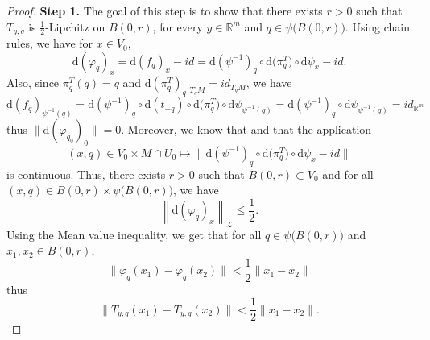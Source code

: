 \documentclass[10pt,a4paper]{amsart}
\newcommand{\R}{\mathbb{R}}
\renewcommand{\d}{\mathrm{d}}
\renewcommand{\leq}{\leqslant}
\newcommand{\opnorm}[1]{{\left\| #1 \right\|}_{\mathcal{L}}}
\begin{document}
\begin{proof}
    \noindent \textbf{Step 1.} The goal of this step is to show that there exists $r > 0$ such that $T_{y,q}$ is $\frac{1}{2}$-Lipchitz on $B(0,r)$, for every $y \in \R^m$ and $q \in \psi \big( B(0,r) \big)$.    
    Using chain rules, we have for $x \in V_0$,
    \[ \d (\varphi_{q})_{x} = \d ( f_{q})_{x} - id = \d (\psi^{-1})_{q} \circ \d \big( \pi_{q}^T\big) \circ \d \psi_{x} - id .  \]
    Also, since $ \pi_{q}^T(q) = q$ and $\d (\pi_{q}^T)_{q} |_{T_q M} = id_{T_{q}M}$, we have
    $$\d (f_{q})_{\psi^{-1}(q)} = \d (\psi^{-1})_{q}  \circ \d (t_{-q}) \circ \d \big( \pi_{q}^T\big) \circ \d \psi_{\psi^{-1}(q)} = \d (\psi^{-1})_{q} \circ \d \psi_{\psi^{-1}(q)} = id_{\R^m}$$
    thus $\| \d (\varphi_{q_0})_{0} \| = 0$.
    Moreover, we know that  and that the application 
    \[ (x,q) \in V_0 \times M \cap U_0 \mapsto  \| \d (\psi^{-1})_{q} \circ \d \big( \pi_{q}^T\big) \circ \d \psi_{x} - id  \| \]
    is continuous.
    Thus, there exists $r > 0$ such that $B(0,r) \subset V_0$ and for all $(x, q) \in B(0,r) \times \psi \big( B(0,r) \big)$, we have
    \begin{equation} \label{eq: maitrise_condition_projection}
        \opnorm{ \d ( \varphi_{q})_{x} }  \leq \frac{1}{2}.
    \end{equation}
    Using the Mean value inequality, we get that for all $q \in \psi \big( B(0,r) \big)$ and $ x_1,x_2 \in  B(0,r)$,
    $$ \| \varphi_{q}(x_1) - \varphi_{q}(x_2) \| < \frac{1}{2} \| x_1 - x_2\|$$
    thus $$ \|T_{y,q}(x_1) -T_{y,q}(x_2) \| < \frac{1}{2} \| x_1 - x_2\|.$$


\end{proof}
\end{document}
